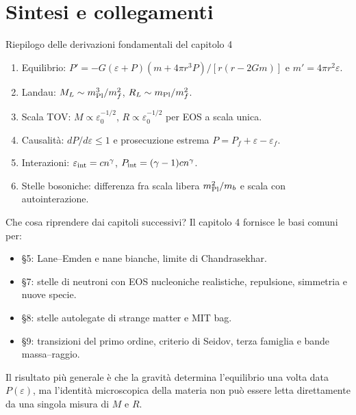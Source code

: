 \section{Sintesi e collegamenti}

\begin{frame}[t]{Riepilogo delle derivazioni fondamentali del capitolo 4}
\small
\begin{enumerate}
\item Equilibrio: $P'=-G(\varepsilon+P)(m+4\pi r^3P)/[r(r-2Gm)]$ e $m'=4\pi r^2\varepsilon$.
\item Landau: $M_L\sim m_{\rm Pl}^3/m_f^2$, $R_L\sim m_{\rm Pl}/m_f^2$.
\item Scala TOV: $M\propto\varepsilon_0^{-1/2}$, $R\propto\varepsilon_0^{-1/2}$ per EOS a scala unica.
\item Causalità: $dP/d\varepsilon\leq1$ e prosecuzione estrema $P=P_f+\varepsilon-\varepsilon_f$.
\item Interazioni: $\varepsilon_{\rm int}=cn^\gamma$, $P_{\rm int}=(\gamma-1)cn^\gamma$.
\item Stelle bosoniche: differenza fra scala libera $m_{\rm Pl}^2/m_b$ e scala con autointerazione.
\end{enumerate}
\end{frame}

\begin{frame}[t]{Che cosa riprendere dai capitoli successivi?}
\small
Il capitolo 4 fornisce le basi comuni per:
\begin{itemize}
\item §5: Lane--Emden e nane bianche, limite di Chandrasekhar.
\item §7: stelle di neutroni con EOS nucleoniche realistiche, repulsione, simmetria e nuove specie.
\item §8: stelle autolegate di strange matter e MIT bag.
\item §9: transizioni del primo ordine, criterio di Seidov, terza famiglia e bande massa--raggio.
\end{itemize}
Il risultato più generale è che la gravità determina l'equilibrio una volta data $P(\varepsilon)$, ma l'identità microscopica della materia non può essere letta direttamente da una singola misura di $M$ e $R$.
\end{frame}

\providecommand{\pnsintegfonte}[1]{\vfill\par{\scriptsize\color{gray}#1\par}}
